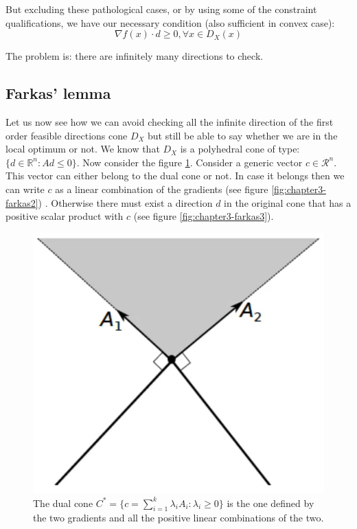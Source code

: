 \par But excluding these pathological cases, or by using some of the constraint qualifications, we have our necessary condition (also sufficient in convex case):
\begin{equation}
    \nabla f(x) \cdot d \geq 0, \forall x \in D_X(x)
\end{equation}
\par The problem is: there are infinitely many directions to check.
%
\subsection{Farkas' lemma}
\par Let us now see how we can avoid checking all the infinite direction of the first order feasible directions cone $D_X$ but still be able to say whether we are in the local optimum or not. We know that $D_X$ is a polyhedral cone of type: $\{d \in \mathbb{R}^n : Ad \leq 0\}$. Now consider the figure \ref{fig:chapter3-farkas1}. Consider a generic vector $c \in \mathcal{R}^n$. This vector can either belong to the dual cone or not. In case it belongs then we can write $c$ as a linear combination of the gradients (see figure \ref{fig:chapter3-farkas2}) . Otherwise there must exist a direction $d$ in the original cone that has a positive scalar product with $c$ (see figure \ref{fig:chapter3-farkas3}).
\begin{figure}
    \centering
    \includegraphics[scale=0.5]{figures/3/chapter3-farkas1.png}
    \caption{The dual cone $C^* = \{c = \sum_{i=1}^k \lambda_i A_i : \lambda_i \geq 0\}$ is the one defined by the two gradients and all the positive linear combinations of the two.}
    \label{fig:chapter3-farkas1}
\end{figure}
